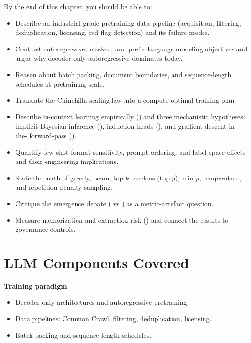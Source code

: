 By the end of this chapter, you should be able to:
\begin{itemize}
  \item Describe an industrial-grade pretraining data pipeline
        (acquisition, filtering, deduplication, licensing, red-flag
        detection) and its failure modes.
  \item Contrast autoregressive, masked, and prefix language modeling
        objectives and argue why decoder-only autoregressive
        dominates today.
  \item Reason about batch packing, document boundaries, and
        sequence-length schedules at pretraining scale.
  \item Translate the Chinchilla scaling law into a compute-optimal
        training plan.
  \item Describe in-context learning empirically
        (\citealt{brown2020language}) and three mechanistic
        hypotheses: implicit Bayesian inference
        (\citealt{xie2022explanation}), induction heads
        (\citealt{olsson2022induction}), and gradient-descent-in-the-
        forward-pass (\citealt{vonoswald2023transformers}).
  \item Quantify few-shot format sensitivity, prompt ordering, and
        label-space effects and their engineering implications.
  \item State the math of greedy, beam, top-$k$, nucleus (top-$p$),
        min-$p$, temperature, and repetition-penalty sampling.
  \item Critique the emergence debate (\citealt{wei2022emergent} vs
        \citealt{schaeffer2023mirage}) as a metric-artefact question.
  \item Measure memorization and extraction risk
        (\citealt{carlini2021extracting,carlini2023quantifying}) and
        connect the results to governance controls.
\end{itemize}

\section{LLM Components Covered}

\textbf{Training paradigm}
\begin{itemize}
  \item Decoder-only architectures and autoregressive pretraining.
  \item Data pipelines: Common Crawl, filtering, deduplication,
        licensing.
  \item Batch packing and sequence-length schedules.
\end{itemize}

